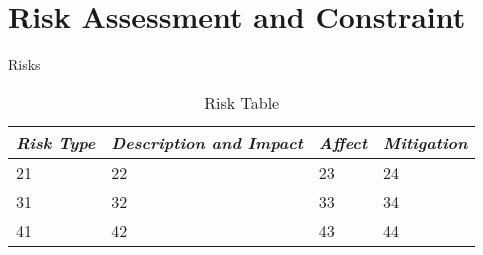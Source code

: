 \section{Risk Assessment and Constraint}

Risks

\begin{table}[H]
	\begin{tabular}{llll}
	\hline
	\multicolumn{1}{|l|}{\textit{\textbf{Risk Type}}} & \multicolumn{1}{l|}{\textit{\textbf{Description and Impact}}} & \multicolumn{1}{l|}{\textit{\textbf{Affect}}} & \multicolumn{1}{l|}{\textit{\textbf{Mitigation}}} \\ \hline
	21                                                & 22                                                            & 23                                            & 24                                                \\
	31                                                & 32                                                            & 33                                            & 34                                                \\
	41                                                & 42                                                            & 43                                            & 44
	\end{tabular}
	\caption{Risk Table}
	\label{tab:RiskTable}
\end{table}